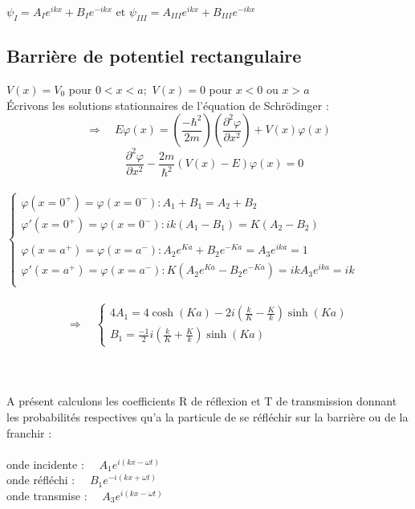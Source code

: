 \documentclass[11pt]{report}
\begin{document}
$\psi_I=A_Ie^{ikx}+B_Ie^{-ikx}$ \quad et \quad $ \psi_{III}=A_{III}e^{ikx}+B_{III}e^{-ikx}$


\subsection{Barrière de potentiel rectangulaire}
$V(x)=V_0$ pour $0<x<a;$ \qquad $V(x)=0$ pour $x<0$ ou $x>a$\\

Écrivons les solutions stationnaires de l'équation de Schrödinger :\\

\begin{equation}
    \Rightarrow \quad E\varphi(x)=\left( \frac{-\hbar^2}{2m} \right)\left( \frac{\partial^2 \varphi}{\partial x^2} \right) + V(x)\varphi(x)
\nonumber
\end{equation}
\begin{equation}
    \quad \frac{\partial^2\varphi}{\partial x^2}-\frac{2m}{\hbar^2}\left( V(x)-E \right)\varphi(x)=0
    \nonumber
\end{equation}\\


$\begin{cases}
\varphi(x=0^+)=\varphi(x=0^-) : A_1 + B_1 = A_2 + B_2\\
\varphi'(x=0^+)=\varphi(x=0^-) : ik(A_1 - B_1) = K(A_2 - B_2)\\\\
\varphi(x=a^+)=\varphi(x=a^-) : A_2e^{Ka}+B_2e^{-Ka}=A_3e^{ika}=1\\
\varphi'(x=a^+)=\varphi(x=a^-) : K(A_2e^{Ka}-B_2e^{-Ka})=ikA_3e^{ika}=ik\\
\end{cases}$\\\\

\begin{equation}
    \Rightarrow \quad 
    \begin{cases}
    4A_1=4\cosh(Ka)-2i(\frac{k}{K}-\frac{K}{k})\sinh(Ka)\\
    B_1=\frac{-1}{2}i(\frac{k}{K}+\frac{K}{k})\sinh(Ka)
    \end{cases}
    \nonumber
\end{equation}\\\\\\
A présent calculons les coefficients R de réflexion et T de transmission donnant les probabilités respectives qu'a la particule de se réfléchir sur la barrière ou de la franchir : \\ \\
onde incidente : $\quad A_1e^{i(kx-\omega t)}$\\
onde réfléchi : $\quad B_1e^{-i(kx+\omega t)}$\\                
onde transmise : $\quad A_3e^{i(kx-\omega t)}$\\
\end{document}
